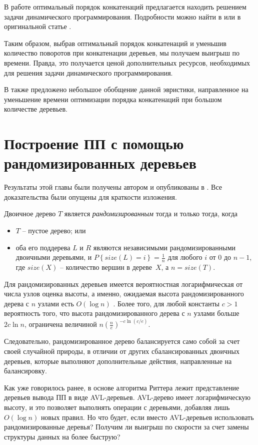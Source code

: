 \documentclass[14pt]{article}
\begin{document}
В работе \cite{OurPracticalTest} оптимальный порядок конкатенаций предлагается находить решением задачи динамического программирования.
Подробности можно найти в \cite{MasterPaper} или в оригинальной статье \cite{OurPracticalTest}.

Таким образом, выбрав оптимальный порядок конкатенаций и уменьшив количество поворотов при конкатенации деревьев,
мы получаем выигрыш по времени. Правда, это получается ценой дополнительных ресурсов, необходимых для решения задачи
динамического программирования.

В \cite{MasterPaper} также предложено небольшое обобщение данной эвристики, направленное на уменьшение
времени оптимизации порядка конкатенаций при большом количестве деревьев.

\section{Построение ПП с помощью рандомизированных деревьев}

Результаты этой главы были получены автором и опубликованы в \cite{OurPracticalTest}.
Все доказательства были опущены для краткости изложения.

Двоичное дерево $T$ является {\it рандомизированным} тогда и только тогда,
когда 
\begin{itemize}
	\item $T$ -- пустое дерево; или
	\item оба его поддерева $L$ и $R$ являются независимыми рандомизированными двоичными деревьями, и
$P\left\{size(L)=i\right\} = \frac{1}{n}$ для любого $i$ от 0 до $n-1$, где $size(X)$ -- количество вершин в дереве~$X$, а $n = size(T)$.
\end{itemize}

Для рандомизированных деревьев имеется вероятностная логарифмическая от числа узлов оценка высоты, а
именно, ожидаемая высота рандомизированного дерева с $n$ узлами есть $O(\log n)$ \cite{Seidel&Aragon:1996}.
Более того, для любой константы $c>1$ вероятность того, что высота рандомизированного дерева с $n$ узлами больше $2c\ln n$,
ограничена величиной $n\left(\frac{n}{e}\right)^{-c\ln(c/e)}$.

Следовательно, рандомизированное дерево балансируется само собой за счет своей случайной природы, в отличии
от других сбалансированных двоичных деревьев, которые выполняют дополнительные действия, направленные на балансировку.

Как уже говорилось ранее, в основе алгоритма Риттера лежит представление деревьев вывода ПП в виде AVL-деревьев.
AVL-дерево имеет логарифмическую высоту, и это позволяет выполнять операции с деревьями, добавляя лишь $O(\log n)$ новых правил.
Но что будет, если вместо AVL-деревьев использовать рандомизированные деревья? Получим ли выигрыш по скорости
за счет замены структуры данных на более быструю?
\end{document}
